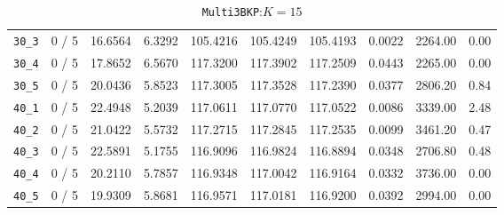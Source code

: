 \begin{table}[h!]
\begin{center}
\begin{tabular}{| c | c | c | c | c | c | c | c | c | c |}
\verb|30_3| & 0 / 5 & 16.6564 & 6.3292 & 105.4216 & 105.4249 & 105.4193 & 0.0022 & 2264.00 & 0.00\\ 
\verb|30_4| & 0 / 5 & 17.8652 & 6.5670 & 117.3200 & 117.3902 & 117.2509 & 0.0443 & 2265.00 & 0.00\\ 
\verb|30_5| & 0 / 5 & 20.0436 & 5.8523 & 117.3005 & 117.3528 & 117.2390 & 0.0377 & 2806.20 & 0.84\\ 
\verb|40_1| & 0 / 5 & 22.4948 & 5.2039 & 117.0611 & 117.0770 & 117.0522 & 0.0086 & 3339.00 & 2.48\\ 
\verb|40_2| & 0 / 5 & 21.0422 & 5.5732 & 117.2715 & 117.2845 & 117.2535 & 0.0099 & 3461.20 & 0.47\\ 
\verb|40_3| & 0 / 5 & 22.5891 & 5.1755 & 116.9096 & 116.9824 & 116.8894 & 0.0348 & 2706.80 & 0.48\\ 
\verb|40_4| & 0 / 5 & 20.2110 & 5.7857 & 116.9348 & 117.0042 & 116.9164 & 0.0332 & 3736.00 & 0.00\\ 
\verb|40_5| & 0 / 5 & 19.9309 & 5.8681 & 116.9571 & 117.0181 & 116.9200 & 0.0392 & 2994.00 & 0.00\\ 
\hline
\end{tabular}
\caption{\texttt{Multi3BKP}:$K=15$}
\label{table:multi:15}
\end{center}
\end{table}




